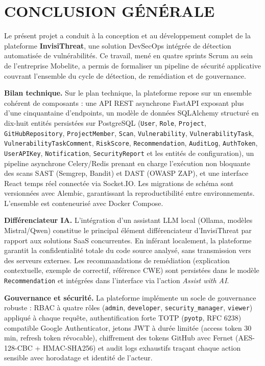 \chapter*{CONCLUSION GÉNÉRALE}

\noindent Le présent projet a conduit à la conception et au développement complet de la plateforme \textbf{InvisiThreat}, une solution DevSecOps intégrée de détection automatisée de vulnérabilités. Ce travail, mené en quatre sprints Scrum au sein de l'entreprise Mobelite, a permis de formaliser un pipeline de sécurité applicative couvrant l'ensemble du cycle de détection, de remédiation et de gouvernance.

\medskip
\noindent \textbf{Bilan technique.} Sur le plan technique, la plateforme repose sur un ensemble cohérent de composants : une API REST asynchrone FastAPI exposant plus d'une cinquantaine d'endpoints, un modèle de données SQLAlchemy structuré en dix-huit entités persistées sur PostgreSQL (\texttt{User}, \texttt{Role}, \texttt{Project}, \texttt{GitHubRepository}, \texttt{ProjectMember}, \texttt{Scan}, \texttt{Vulnerability}, \texttt{VulnerabilityTask}, \texttt{VulnerabilityTaskComment}, \texttt{RiskScore}, \texttt{Recommendation}, \texttt{AuditLog}, \texttt{AuthToken}, \texttt{UserAPIKey}, \texttt{Notification}, \texttt{SecurityReport} et les entités de configuration), un pipeline asynchrone Celery/Redis prenant en charge l'exécution non bloquante des scans SAST (Semgrep, Bandit) et DAST (OWASP ZAP), et une interface React temps réel connectée via Socket.IO. Les migrations de schéma sont versionnées avec Alembic, garantissant la reproductibilité entre environnements. L'ensemble est conteneurisé avec Docker Compose.

\medskip
\noindent \textbf{Différenciateur IA.} L'intégration d'un assistant LLM local (Ollama, modèles Mistral/Qwen) constitue le principal élément différenciateur d'InvisiThreat par rapport aux solutions SaaS concurrentes. En inférant localement, la plateforme garantit la confidentialité totale du code source analysé, sans transmission vers des serveurs externes. Les recommandations de remédiation (explication contextuelle, exemple de correctif, référence CWE) sont persistées dans le modèle \texttt{Recommendation} et intégrées dans l'interface via l'action \textit{Assist with AI}.

\medskip
\noindent \textbf{Gouvernance et sécurité.} La plateforme implémente un socle de gouvernance robuste : RBAC à quatre rôles (\texttt{admin}, \texttt{developer}, \texttt{security\_manager}, \texttt{viewer}) appliqué à chaque requête, authentification forte TOTP (\texttt{pyotp}, RFC 6238) compatible Google Authenticator, jetons JWT à durée limitée (access token 30 min, refresh token révocable), chiffrement des tokens GitHub avec Fernet (AES-128-CBC + HMAC-SHA256) et audit logs exhaustifs traçant chaque action sensible avec horodatage et identité de l'acteur.

